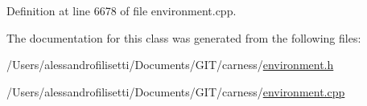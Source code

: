 Definition at line 6678 of file environment.\-cpp.



The documentation for this class was generated from the following files\-:\begin{DoxyCompactItemize}
\item 
/\-Users/alessandrofilisetti/\-Documents/\-G\-I\-T/carness/\hyperlink{environment_8h}{environment.\-h}\item 
/\-Users/alessandrofilisetti/\-Documents/\-G\-I\-T/carness/\hyperlink{environment_8cpp}{environment.\-cpp}\end{DoxyCompactItemize}
